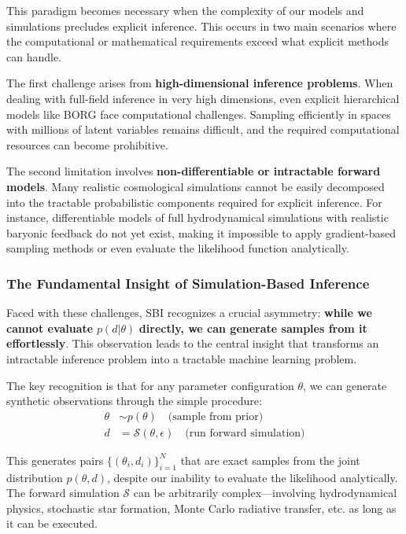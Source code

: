 \documentclass{SciPost}
\begin{document}
This paradigm becomes necessary when the complexity of our models and simulations precludes explicit inference. This occurs in two main scenarios where the computational or mathematical requirements exceed what explicit methods can handle.

The first challenge arises from \textbf{high-dimensional inference problems}. When dealing with full-field inference in very high dimensions, even explicit hierarchical models like BORG face computational challenges. Sampling efficiently in spaces with millions of latent variables remains difficult, and the required computational resources can become prohibitive.

The second limitation involves \textbf{non-differentiable or intractable forward models}. Many realistic cosmological simulations cannot be easily decomposed into the tractable probabilistic components required for explicit inference. For instance, differentiable models of full hydrodynamical simulations with realistic baryonic feedback do not yet exist, making it impossible to apply gradient-based sampling methods or even evaluate the likelihood function analytically.

\subsubsection{The Fundamental Insight of Simulation-Based Inference}

Faced with these challenges, SBI recognizes a crucial asymmetry: \textbf{while we cannot evaluate} $p(d|\theta)$ \textbf{directly, we can generate samples from it effortlessly}. This observation leads to the central insight that transforms an intractable inference problem into a tractable machine learning problem.

The key recognition is that for any parameter configuration $\theta$, we can generate synthetic observations through the simple procedure:
\begin{align}
    \theta &\sim p(\theta) \quad \text{(sample from prior)} \\
    d &= \mathcal{S}(\theta, \epsilon) \quad \text{(run forward simulation)}
\end{align}

This generates pairs $\{(\theta_i, d_i)\}_{i=1}^N$ that are exact samples from the joint distribution $p(\theta, d)$, despite our inability to evaluate the likelihood analytically. The forward simulation $\mathcal{S}$ can be arbitrarily complex—involving hydrodynamical physics, stochastic star formation, Monte Carlo radiative transfer, etc. as long as it can be executed.
\end{document}
